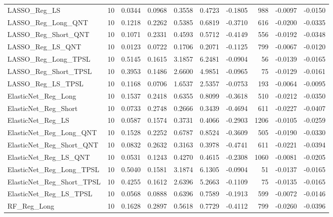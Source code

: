 \begin{tabular}{llrrrrrrrr}
\cline{1-10}
LASSO\_Reg\_LS & 10 & 0.0344 & 0.0968 & 0.3558 & 0.4723 & -0.1805 & 988 & -0.0097 & -0.0150 \\
\cline{1-10}
LASSO\_Reg\_Long\_QNT & 10 & 0.1218 & 0.2262 & 0.5385 & 0.6819 & -0.3710 & 616 & -0.0200 & -0.0335 \\
\cline{1-10}
LASSO\_Reg\_Short\_QNT & 10 & 0.1071 & 0.2331 & 0.4593 & 0.5712 & -0.4149 & 556 & -0.0192 & -0.0348 \\
\cline{1-10}
LASSO\_Reg\_LS\_QNT & 10 & 0.0123 & 0.0722 & 0.1706 & 0.2071 & -0.1125 & 799 & -0.0067 & -0.0120 \\
\cline{1-10}
LASSO\_Reg\_Long\_TPSL & 10 & 0.5145 & 0.1615 & 3.1857 & 6.2481 & -0.0904 & 56 & -0.0139 & -0.0165 \\
\cline{1-10}
LASSO\_Reg\_Short\_TPSL & 10 & 0.3953 & 0.1486 & 2.6600 & 4.9851 & -0.0965 & 75 & -0.0129 & -0.0161 \\
\cline{1-10}
LASSO\_Reg\_LS\_TPSL & 10 & 0.1168 & 0.0706 & 1.6537 & 2.5357 & -0.0753 & 193 & -0.0064 & -0.0095 \\
\cline{1-10}
ElasticNet\_Reg\_Long & 10 & 0.1537 & 0.2418 & 0.6355 & 0.8099 & -0.3618 & 510 & -0.0212 & -0.0350 \\
\cline{1-10}
ElasticNet\_Reg\_Short & 10 & 0.0733 & 0.2748 & 0.2666 & 0.3439 & -0.4694 & 611 & -0.0227 & -0.0407 \\
\cline{1-10}
ElasticNet\_Reg\_LS & 10 & 0.0587 & 0.1574 & 0.3731 & 0.4066 & -0.2903 & 1206 & -0.0105 & -0.0259 \\
\cline{1-10}
ElasticNet\_Reg\_Long\_QNT & 10 & 0.1528 & 0.2252 & 0.6787 & 0.8524 & -0.3609 & 505 & -0.0190 & -0.0330 \\
\cline{1-10}
ElasticNet\_Reg\_Short\_QNT & 10 & 0.0832 & 0.2632 & 0.3163 & 0.3978 & -0.4741 & 611 & -0.0221 & -0.0394 \\
\cline{1-10}
ElasticNet\_Reg\_LS\_QNT & 10 & 0.0531 & 0.1243 & 0.4270 & 0.4615 & -0.2308 & 1060 & -0.0081 & -0.0205 \\
\cline{1-10}
ElasticNet\_Reg\_Long\_TPSL & 10 & 0.5040 & 0.1581 & 3.1874 & 6.1305 & -0.0904 & 51 & -0.0137 & -0.0165 \\
\cline{1-10}
ElasticNet\_Reg\_Short\_TPSL & 10 & 0.4255 & 0.1612 & 2.6396 & 5.2663 & -0.1109 & 75 & -0.0135 & -0.0165 \\
\cline{1-10}
ElasticNet\_Reg\_LS\_TPSL & 10 & 0.0568 & 0.0888 & 0.6396 & 0.7589 & -0.1913 & 599 & -0.0072 & -0.0146 \\
\cline{1-10}
RF\_Reg\_Long & 10 & 0.1628 & 0.2897 & 0.5618 & 0.7729 & -0.4112 & 799 & -0.0260 & -0.0396 \\

\end{tabular}
